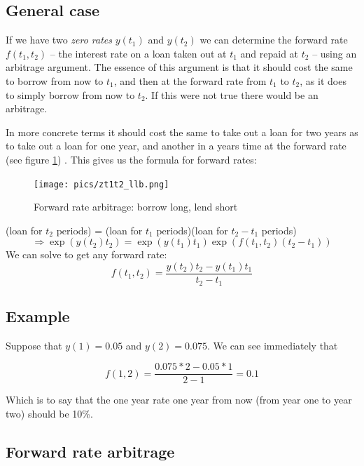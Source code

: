 \subsection{General case}

If we have two \textit{zero rates} $y(t_1)$ and $y(t_2)$ we can determine the forward rate $f(t_1,t_2)$ -- the interest rate on a loan taken out at $t_1$ and repaid at $t_2$ -- using an arbitrage argument. The essence of this argument is that it should cost the same to borrow from now to $t_1$, and then at the forward rate from $t_1$ to $t_2$, as it does to simply borrow from now to $t_2$. If this were not true there would be an arbitrage.

In more concrete terms it should cost the same to take out a loan for two years as to take out a loan for one year, and another in a years time at the forward rate (see figure \ref{frArb}) . This gives us the formula for forward rates:

\begin{figure}[htbp]
\begin{center}
  \texttt{[image: pics/zt1t2\_llb.png]} \\
  \caption{Forward rate arbitrage: borrow long, lend short}
\label{frArb}
\end{center}
\end{figure}


\begin{center}
(loan for $t_2$ periods)  = (loan for $t_1$ periods)(loan for $t_2-t_1$ periods)
\[\Rightarrow \exp(y(t_2)t_2) = \exp(y(t_1)t_1)\exp(f(t_1,t_2)(t_2-t_1)) \]
We can solve to get any forward rate:
\begin{equation}f(t_1,t_2) = \frac{y(t_2)t_2-y(t_1)t_1}{t_2-t_1}  \label{fRates}\end{equation}
\end{center}


\subsection{Example} Suppose that $y(1) = 0.05$ and $y(2) = 0.075$. We can see immediately that

\[f(1,2) = \frac{0.075*2-0.05*1}{2-1} = 0.1 \]


Which is to say that the one year rate one year from now (from year one to year two) should be 10\%.

\subsection{Forward rate arbitrage}

